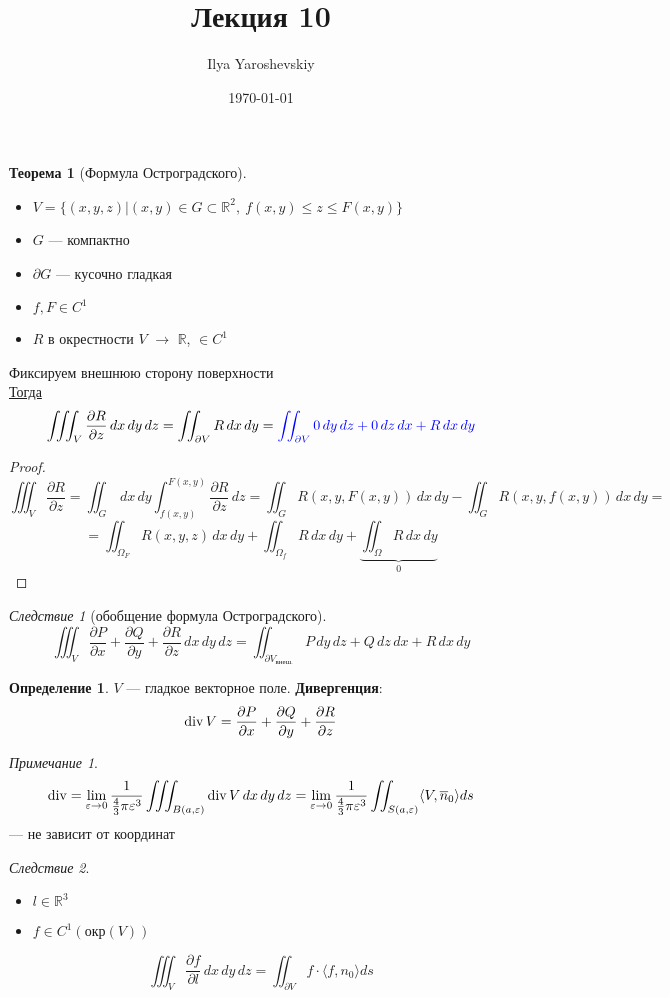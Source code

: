 \documentclass[english]{article}
\author{Ilya Yaroshevskiy}
\date{\today}
\title{Лекция 10}
\newcommand{\R}{\mathbb{R}}
\theoremstyle{plain}
\theoremstyle{remark}
\newtheorem*{remark}{Примечание}
\newtheorem{corollary}{Следствие}[theorem]
\theoremstyle{definition}
\newtheorem{theorem}{Теорема}[section]
\newtheorem*{definition}{Определение}
\begin{document}
\maketitle
\tableofcontents

\newcommand{\rot}{\mathop{\rm rot}\nolimits}
\newcommand{\M}{\mathfrak{M}}

\begin{theorem}[Формула Остроградского]
\-
\begin{itemize}
\item \(V = \{(x, y, z) \big| (x, y) \in G \subset \R^2,\ f(x, y) \le z \le F(x, y)\}\)
\item \(G\) --- компактно
\item \(\partial G\) --- кусочно гладкая
\item \(f, F \in C^1\)
\item \(R\) в окрестности \(V\) \(\to\) \(\R\), \(\in C^1\)
\end{itemize}
Фиксируем внешнюю сторону поверхности \\
\uline{Тогда}
\[ \iiint_V \frac{\partial R}{\partial z}\,dx\,dy\,dz = \iint_{\partial V}R\,dx\,dy = \color{blue} \iint_{\partial V} 0\,dy\,dz + 0\,dz\,dx + R\,dx\,dy \color{black} \]
\end{theorem}
\begin{proof}
\[ \iiint_V \frac{\partial R}{\partial z} = \iint_G \,dx\,dy \int_{f(x, y)}^{F(x, y)} \frac{\partial R}{\partial z}\,dz = \iint_G R(x, y, F(x, y))\,dx\,dy - \iint_G R(x, y, f(x, y)) \,dx\,dy =  \]
\[ = \iint_{\Omega_F} R(x, y, z)\,dx\,dy + \iint_{\Omega_f} R\,dx\,dy + \underbrace{\iint_{\Omega} R \,dx\,dy}_0 \]
\end{proof}
\begin{corollary}[обобщение формула Остроградского]
\[ \iiint_V \frac{\partial P}{\partial x} + \frac{\partial Q}{\partial y} + \frac{\partial R}{\partial z} \, dx\,dy\,dz = \iint_{\partial V_\text{внеш.}} P\,dy\,dz + Q\,dz\,dx + R\,dx\,dy\]
\end{corollary}
\begin{definition}
\(V\) --- гладкое векторное поле. \textbf{Дивергенция}:
\[ \mathop{\rm div}V = \frac{\partial P}{\partial x} + \frac{\partial Q}{\partial y} + \frac{\partial R}{\partial z} \]
\end{definition}
\begin{remark}
\[ \mathop{\rm div} = \lim_{\varepsilon \to 0} \frac{1}{\frac{4}{3}\pi\varepsilon^3} \iiint_{B(a, \varepsilon)} \mathop{\rm div} V \,dx\,dy\,dz  = \lim_{\varepsilon \to 0} \frac{1}{\frac{4}{3}\pi\varepsilon^3} \iint_{S(a, \varepsilon)} \langle V, \overline{n}_0 \rangle ds\]
--- не зависит от координат
\end{remark}
\begin{corollary}
\-
\begin{itemize}
\item \(l \in \R^3\)
\item \(f \in C^1(\text{окр}(V))\)
\end{itemize}
\[ \iiint_V \frac{\partial f}{\partial l} \,dx\,dy\,dz = \iint_{\partial V} f\cdot \langle f, n_0 \rangle ds \]
\end{corollary}
\end{document}
